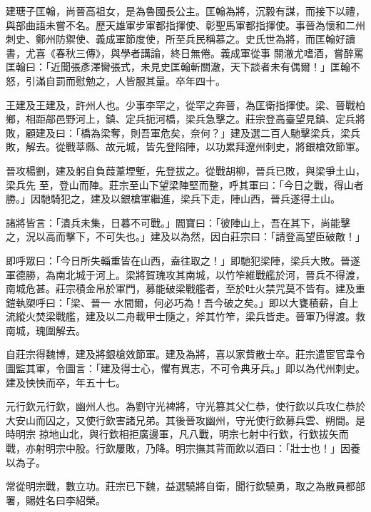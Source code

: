 \begin{pinyinscope}
 建瑭子匡翰，尚晉高祖女，是為魯國長公主。匡翰為將，沉毅有謀，而接下以禮，與部曲語未嘗不名。歷天雄軍步軍都指揮使、彰聖馬軍都指揮使。事晉為懷和二州刺史、鄭州防禦使、義成軍節度使，所至兵民稱慕之。史氏世為將，而匡翰好讀書，尤喜《春秋三傳》，與學者講論，終日無倦。義成軍從事
 關澈尤嗜酒，嘗醉罵匡翰曰：「近聞張彥澤臠張式，未見史匡翰斬關澈，天下談者未有偶爾！」匡翰不怒，引滿自罰而慰勉之，人皆服其量。卒年四十。



 王建及王建及，許州人也。少事李罕之，從罕之奔晉，為匡衛指揮使。梁、晉戰柏鄉，相距鄗邑野河上，鎮、定兵扼河橋，梁兵急擊之。莊宗登高臺望見鎮、定兵將敗，顧建及曰：「橋為梁奪，則吾軍危矣，奈何？」建及選二百人馳擊梁兵，梁兵敗，解去。從戰莘縣、故元城，皆先登陷陣，以功累拜遼州刺史，將銀槍效節軍。



 晉攻楊劉，建及躬自負葭葦堙塹，先登拔之。從戰胡柳，晉兵已敗，與梁爭土山，梁兵先
 至，登山而陣。莊宗至山下望梁陣堅而整，呼其軍曰：「今日之戰，得山者勝。」因馳騎犯之，建及以銀槍軍繼進，梁兵下走，陣山西，晉兵遂得土山。



 諸將皆言：「潰兵未集，日暮不可戰。」閻寶曰：「彼陣山上，吾在其下，尚能擊之，況以高而擊下，不可失也。」建及以為然，因白莊宗曰：「請登高望臣破敵！」



 即呼眾曰：「今日所失輜重皆在山西，盍往取之！」即馳犯梁陣，梁兵大敗。晉遂軍德勝，為南北城于河上。梁將賀瑰攻其南城，以竹笮維戰艦於河，晉兵不得渡，南城危甚。莊宗積金帛於軍門，募能破梁戰艦者，至於吐火禁咒莫不皆有。建及重鎧執槊呼曰：「梁、晉一
 水間爾，何必巧為！吾今破之矣。」即以大甕積薪，自上流縱火焚梁戰艦，建及以二舟載甲士隨之，斧其竹笮，梁兵皆走。晉軍乃得渡。救南城，瑰圍解去。



 自莊宗得魏博，建及將銀槍效節軍。建及為將，喜以家貲散士卒。莊宗遣宦官韋令圖監其軍，令圖言：「建及得士心，懼有異志，不可令典牙兵。」即以為代州刺史。建及怏怏而卒，年五十七。



 元行欽元行欽，幽州人也。為劉守光裨將，守光篡其父仁恭，使行欽以兵攻仁恭於大安山而囚之，又使行欽害諸兄弟。其後晉攻幽州，守光使行欽募兵雲、朔間。是時明宗
 掠地山北，與行欽相拒廣邊軍，凡八戰，明宗七射中行欽，行欽拔矢而戰，亦射明宗中股。行欽屢敗，乃降。明宗撫其背而飲以酒曰：「壯士也！」因養以為子。



 常從明宗戰，數立功。莊宗已下魏，益選驍將自衛，聞行欽驍勇，取之為散員都部署，賜姓名曰李紹榮。




\end{pinyinscope}
